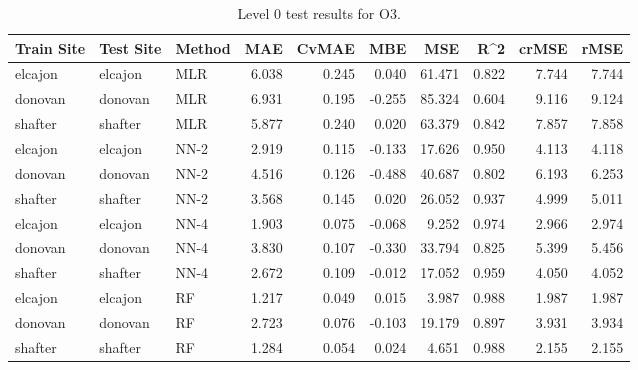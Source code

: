 \begin{table}[h]
\begin{tabular}{lllrrrrrrr}
\toprule
 Train Site & Test Site & Method &   MAE &  CvMAE &       MBE &     MSE &   R\textasciicircum2 &  crMSE &   rMSE \\
\midrule
elcajon & elcajon & MLR & 6.038 & 0.245 & 0.040 & 61.471 & 0.822 & 7.744 & 7.744\\
donovan & donovan & MLR & 6.931 & 0.195 & -0.255 & 85.324 & 0.604 & 9.116 & 9.124\\
shafter & shafter & MLR & 5.877 & 0.240 & 0.020 & 63.379 & 0.842 & 7.857 & 7.858\\
elcajon & elcajon & NN-2 & 2.919 & 0.115 & -0.133 & 17.626 & 0.950 & 4.113 & 4.118\\
donovan & donovan & NN-2 & 4.516 & 0.126 & -0.488 & 40.687 & 0.802 & 6.193 & 6.253\\
shafter & shafter & NN-2 & 3.568 & 0.145 & 0.020 & 26.052 & 0.937 & 4.999 & 5.011\\
elcajon & elcajon & NN-4 & 1.903 & 0.075 & -0.068 & 9.252 & 0.974 & 2.966 & 2.974\\
donovan & donovan & NN-4 & 3.830 & 0.107 & -0.330 & 33.794 & 0.825 & 5.399 & 5.456\\
shafter & shafter & NN-4 & 2.672 & 0.109 & -0.012 & 17.052 & 0.959 & 4.050 & 4.052\\
elcajon & elcajon & RF & 1.217 & 0.049 & 0.015 & 3.987 & 0.988 & 1.987 & 1.987\\
donovan & donovan & RF & 2.723 & 0.076 & -0.103 & 19.179 & 0.897 & 3.931 & 3.934\\
shafter & shafter & RF & 1.284 & 0.054 & 0.024 & 4.651 & 0.988 & 2.155 & 2.155\\
\bottomrule
\end{tabular}
\caption{Level 0 test results for O3.}
\end{table}
